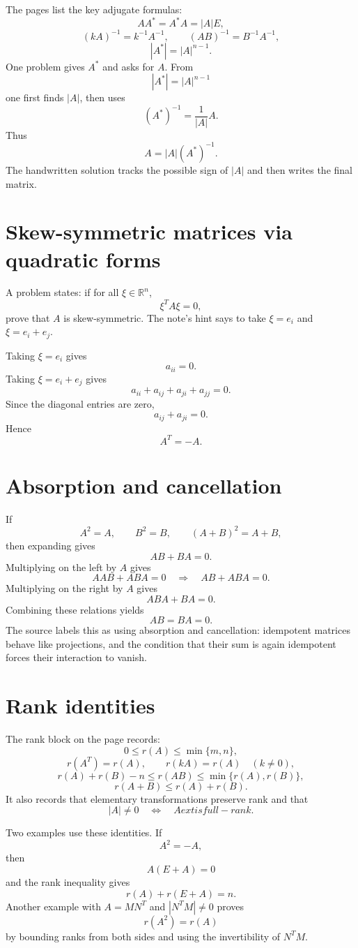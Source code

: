 The pages list the key adjugate formulas:
\[
  AA^*=A^*A=|A|E,
\]
\[
  (kA)^{-1}=k^{-1}A^{-1},\qquad
  (AB)^{-1}=B^{-1}A^{-1},
\]
\[
  |A^*|=|A|^{n-1}.
\]
One problem gives $A^*$ and asks for $A$.  From
\[
  |A^*|=|A|^{n-1}
\]
one first finds $|A|$, then uses
\[
  (A^*)^{-1}=
\frac1{|A|}A.
\]
Thus
\[
  A=|A|(A^*)^{-1}.
\]
The handwritten solution tracks the possible sign of $|A|$ and then writes the final matrix.

\section{Skew-symmetric matrices via quadratic forms}

A problem states: if for all $\xi\in\mathbb R^n$,
\[
  \xi^TA\xi=0,
\]
prove that $A$ is skew-symmetric.  The note's hint says to take $\xi=e_i$ and $\xi=e_i+e_j$.

Taking $\xi=e_i$ gives
\[
  a_{ii}=0.
\]
Taking $\xi=e_i+e_j$ gives
\[
  a_{ii}+a_{ij}+a_{ji}+a_{jj}=0.
\]
Since the diagonal entries are zero,
\[
  a_{ij}+a_{ji}=0.
\]
Hence
\[
  A^T=-A.
\]

\section{Absorption and cancellation}

If
\[
  A^2=A,\qquad B^2=B,\qquad (A+B)^2=A+B,
\]
then expanding gives
\[
  AB+BA=0.
\]
Multiplying on the left by $A$ gives
\[
  AAB+ABA=0\quad\Longrightarrow\quad AB+ABA=0.
\]
Multiplying on the right by $A$ gives
\[
  ABA+BA=0.
\]
Combining these relations yields
\[
  AB=BA=0.
\]
The source labels this as using absorption and cancellation: idempotent matrices behave like projections, and the condition that their sum is again idempotent forces their interaction to vanish.

\section{Rank identities}

The rank block on the page records:
\[
  0\le r(A)\le\min\{m,n\},
\]
\[
  r(A^T)=r(A),\qquad r(kA)=r(A)\quad(k\ne0),
\]
\[
  r(A)+r(B)-n\le r(AB)\le\min\{r(A),r(B)\},
\]
\[
  r(A+B)\le r(A)+r(B).
\]
It also records that elementary transformations preserve rank and that
\[
  |A|\ne0\quad\Longleftrightarrow\quad A	ext{ is full-rank}.
\]

Two examples use these identities.  If
\[
  A^2=-A,
\]
then
\[
  A(E+A)=0
\]
and the rank inequality gives
\[
  r(A)+r(E+A)=n.
\]
Another example with $A=MN^T$ and $|N^TM|\ne0$ proves
\[
  r(A^2)=r(A)
\]
by bounding ranks from both sides and using the invertibility of $N^TM$.

